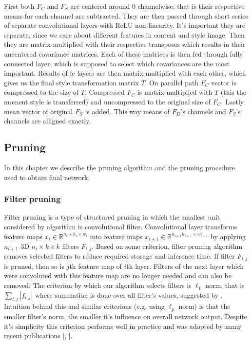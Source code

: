\documentclass[../Main.tex]{subfiles}
\begin{document}
    First both $F_C$ and $F_S$ are centered around 0 channelwise, that is their respective 
    means for each channel are subtracted. They are then passed through short series of separate 
    convolutional layers with ReLU non-linearity. It's important they are separate,
    since we care about different features in content and style image. Then they 
    are matrix-multiplied with their respective transposes which results in
    their uncentered covariance matrices. Each of these matrices is then fed 
    through fully connected layer, which is supposed to select which covariances
    are the most important. Results of fc layers are then matrix-multiplied
    with each other, which gives us the final style transformation matrix $T$.
    On parallel path $F_C$ vector is compressed to the size of $T$. Compressed 
    $F_C$ is matrix-multiplied with $T$ (this the moment style is transferred)
    and uncompressed to the original size of $F_C$. Lastly mean vector of original $F_S$
    is added. This way means of $F_D$'s channels and $F_S$'s channels are alligned
    exactly.
    
    
    
    
    
    
    
    

\subsection{Pruning}
    In this chapter we describe the pruning algorithm and the pruning procedure 
    used to obtain final network.
    \subsubsection{Filter pruning} 
    Filter pruning is a type of structured pruning in which the smallest unit considered by
    algorithm is convolutional filter. Convolutional layer transforms feature maps
    $x_i \in \mathbb{R}^{n_i \times h_i\times w_i}$ into
    feature maps  $x_{i+1} \in \mathbb{R}^{n_{i+1}h_{i+1} \times w_{i+1}}$ by applying
    $n_{i+1}$ 3D $n_i \times k \times k$ filters $F_{i,j}$. Based on some criterion, filter pruning 
    algorithm removes selected filters to reduce required storage and inference time.
    If filter $F_{i,j}$ is pruned, then so is $j$th feature map of $i$th layer. 
    Filters of the next layer which were convoluted with this feature map are no longer needed 
    and can also be removed. 
    The criterion by which our algorithm selects filters is  
    $\ell_1$ norm, that is $\sum_{i,j}|f_{i,j}|$ where summation is done
    over all filter's values, suggested by \cite{li2016pruning}.
    Intuition behind this and similar criterions (e.g. using 
    $\ell_p$ norm) is that the smaller filter's norm, the smaller it's influence 
    on overall network output. Despite it's simplicity this criterion performs well in practice
    and was adopted by many recent publications [\cite{lottery1}, \cite{lottery2}].
    
\end{document}
